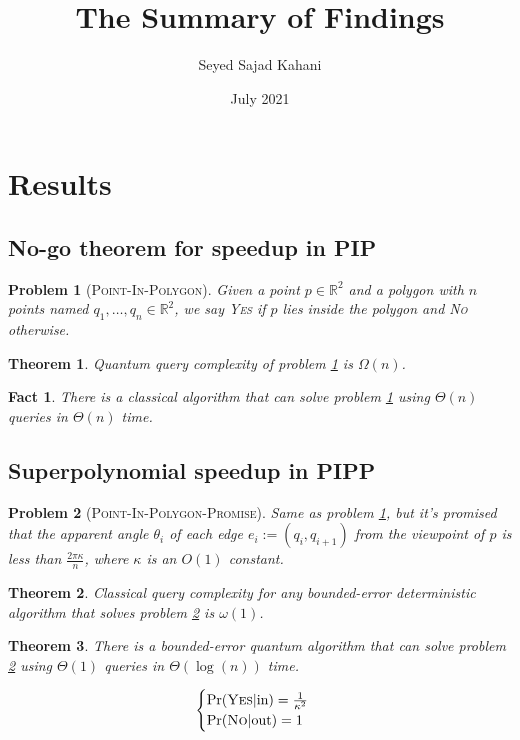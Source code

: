 \documentclass{article}
\title{The Summary of Findings}
\author{Seyed Sajad Kahani}
\date{July 2021}
\newtheorem{fact}{Fact}
\newtheorem{problem}{Problem}
\newtheorem{theorem}{Theorem}
\begin{document}
\maketitle
\section{Results}
\subsection{No-go theorem for speedup in PIP}
\begin{problem}[\textsc{Point-In-Polygon}]
\label{problem:pip}
Given a point $p \in \mathbb{R}^2$ and a polygon with $n$ points named  $q_1, \dots, q_n \in \mathbb{R}^2$, we say \textsc{Yes} if $p$ lies inside the polygon and \textsc{No} otherwise. 
\end{problem}

\begin{theorem}
\label{theorem:quantum-nogo}
Quantum query complexity of problem \ref{problem:pip} is $\Omega(n)$.
\end{theorem}

\begin{fact}
There is a classical algorithm that can solve problem \ref{problem:pip} using $\Theta(n)$ queries in $\Theta(n)$ time.
\end{fact}

\subsection{Superpolynomial speedup in PIPP}

\begin{problem}[\textsc{Point-In-Polygon-Promise}]
\label{problem:pipp}
Same as problem \ref{problem:pip}, but it's promised that the apparent angle $\theta_i$ of each edge $e_i := (q_i, q_{i+1})$ from the viewpoint of $p$ is less than $\frac{2\pi\kappa}{n}$, where $\kappa$ is an $O(1)$ constant.
\end{problem}

\begin{theorem}
\label{theorem:classical-nogo}
Classical query complexity for any bounded-error deterministic algorithm that solves problem \ref{problem:pipp} is $\omega(1)$.
\end{theorem}

\begin{theorem}
\label{theorem:quantum-algorithm}
There is a bounded-error quantum algorithm that can solve problem \ref{problem:pipp} using $\Theta(1)$ queries in $\Theta(\log(n))$ time.

\begin{equation}
    \begin{cases}    
    \Pr(\text{\textsc{Yes}} | \text{in}) = \frac{1}{\kappa^2} \\
    \Pr(\text{\textsc{No}} | \text{out}) = 1 \\
    \end{cases}
\end{equation} 

\end{theorem}
\end{document}
